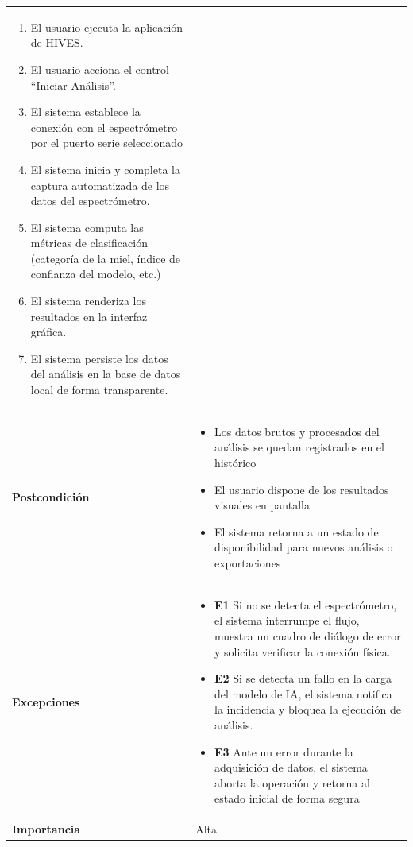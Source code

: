 \begin{center}
\begin{longtable}{ p{} p{} }
\begin{enumerate}
          \def\labelenumi{\arabic{enumi}.}
          \tightlist
          \item El usuario ejecuta la aplicación de HIVES.
          \item El usuario acciona el control ``Iniciar Análisis''.
          \item El sistema establece la conexión con el espectrómetro por el puerto serie seleccionado
          \item El sistema inicia y completa la captura automatizada de los datos del espectrómetro.
          \item El sistema computa las métricas de clasificación (categoría de la miel, índice de confianza del modelo, etc.)
          \item El sistema renderiza los resultados en la interfaz gráfica.
          \item El sistema persiste los datos del análisis en la base de datos local de forma transparente.
        \end{enumerate}\\
      \textbf{Postcondición}        &
        \begin{itemize}
          \tightlist
          \item Los datos brutos y procesados del análisis se quedan registrados en el histórico
          \item El usuario dispone de los resultados visuales en pantalla
          \item El sistema retorna a un estado de disponibilidad para nuevos análisis o exportaciones
        \end{itemize}\\
      \textbf{Excepciones}          &
        \begin{itemize}
          \tightlist
          \item \textbf{E1} Si no se detecta el espectrómetro, el sistema interrumpe el flujo, muestra un cuadro de diálogo de error y solicita verificar la conexión física.
          \item \textbf{E2} Si se detecta un fallo en la carga del modelo de IA, el sistema notifica la incidencia y bloquea la ejecución de análisis.
          \item \textbf{E3} Ante un error durante la adquisición de datos, el sistema aborta la operación y retorna al estado inicial de forma segura
        \end{itemize}\\
      \textbf{Importancia}          & Alta \\
      \bottomrule
    \end{longtable}
\end{center}
